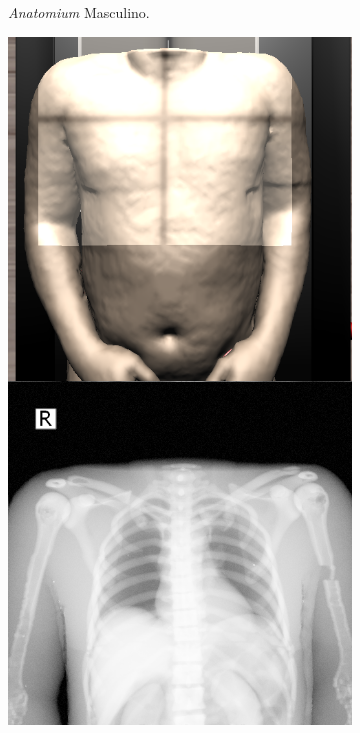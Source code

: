 \begin{figure}[h]
\begin{subfigure}[b]{0.24\linewidth}
        \caption{\emph{Anatomium} Masculino.}
    \end{subfigure}
    \begin{subfigure}[b]{0.24\linewidth}
        \centering
        {\includegraphics[width=\linewidth]{IMG/HVPex.png}}

\end{subfigure}
\end{figure}
